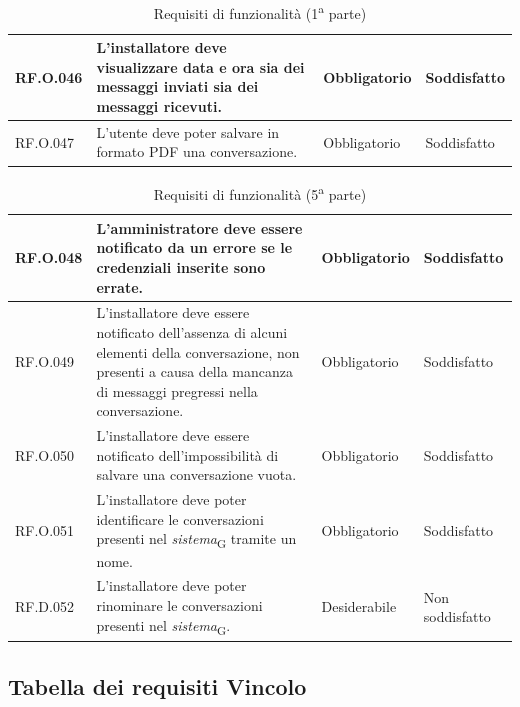 \begin{table}[H]
\begin{tabular}{|C{2.7cm}|L{6.5cm}|C{2.7cm}|C{2.7cm}|}
        RF.O.046 & L'installatore deve visualizzare data e ora sia dei messaggi inviati sia dei messaggi ricevuti. & Obbligatorio & Soddisfatto\\ \hline
        RF.O.047 & L'utente deve poter salvare in formato PDF una conversazione. & Obbligatorio & Soddisfatto \\ \hline
        \end{tabular}
    \caption{Requisiti di funzionalità (1\textsuperscript{a}  parte)}
\end{table}
\begin{table}[H]
\centering
    \begin{tabular}{|C{2.7cm}|L{6.5cm}|C{2.7cm}|C{2.7cm}|}
        \hline
        RF.O.048 & L'amministratore deve essere notificato da un errore se le credenziali inserite sono errate. & Obbligatorio & Soddisfatto \\ \hline
        RF.O.049 & L'installatore deve essere notificato dell'assenza di alcuni elementi della conversazione, non presenti a causa della mancanza di messaggi pregressi nella conversazione. & Obbligatorio & Soddisfatto \\ \hline
        RF.O.050 & L'installatore deve essere notificato dell'impossibilità di salvare una conversazione vuota. & Obbligatorio & Soddisfatto
        \\ \hline
        RF.O.051 & L'installatore deve poter identificare le conversazioni presenti nel \textit{sistema}\textsubscript{G} tramite un nome. & Obbligatorio & Soddisfatto
        \\ \hline
        RF.D.052 & L'installatore deve poter rinominare le conversazioni presenti nel \textit{sistema}\textsubscript{G}. & Desiderabile & Non soddisfatto
        \\ \hline
    \end{tabular}
    \caption{Requisiti di funzionalità (5\textsuperscript{a}  parte)}
\end{table}


\subsection{Tabella dei requisiti Vincolo}

